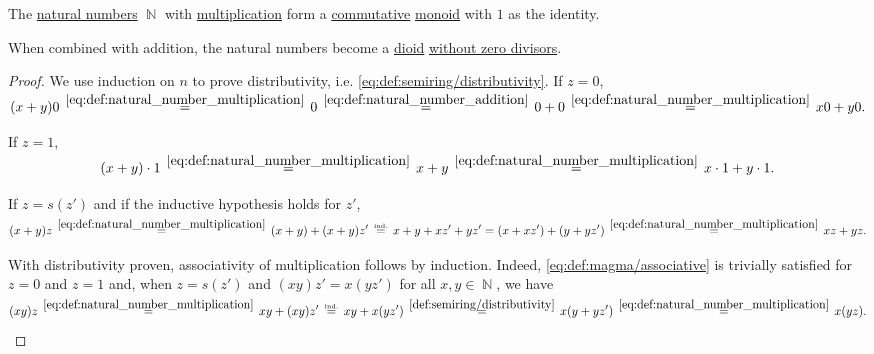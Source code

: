 \begin{proposition}\label{thm:natural_numbers_form_dioid}
  The \hyperref[def:set_of_natural_numbers]{natural numbers} \( \BbbN \) with \hyperref[def:natural_number_multiplication]{multiplication} form a \hyperref[def:magma/commutative]{commutative} \hyperref[def:unital_magma/associative]{monoid} with \( 1 \) as the identity.

  When combined with addition, the natural numbers become a \hyperref[def:semiring]{dioid} \hyperref[def:semiring/no_zero_divisor]{without zero divisors}.
\end{proposition}
\begin{proof}
   We use induction on \( n \) to prove distributivity, i.e. \eqref{eq:def:semiring/distributivity}. If \( z = 0 \),
  \begin{equation*}
    (x + y)0
    \reloset{\eqref{eq:def:natural_number_multiplication}} =
    0
    \reloset{\eqref{eq:def:natural_number_addition}} =
    0 + 0
    \reloset{\eqref{eq:def:natural_number_multiplication}} =
    x0 + y0.
  \end{equation*}

  If \( z = 1 \),
  \begin{equation*}
    (x + y) \cdot 1
    \reloset{\eqref{eq:def:natural_number_multiplication}} =
    x + y
    \reloset{\eqref{eq:def:natural_number_multiplication}} =
    x \cdot 1 + y \cdot 1.
  \end{equation*}

  If \( z = s(z') \) and if the inductive hypothesis holds for \( z' \),
  \begin{equation*}
    (x + y)z
    \reloset{\eqref{eq:def:natural_number_multiplication}} =
    (x + y) + (x + y) z'
    \reloset {\T{ind.}} =
    x + y + xz' + yz'
    =
    (x + xz') + (y + yz')
    \reloset{\eqref{eq:def:natural_number_multiplication}} =
    xz + yz.
  \end{equation*}

   With distributivity proven, associativity of multiplication follows by induction. Indeed, \eqref{eq:def:magma/associative} is trivially satisfied for \( z = 0 \) and \( z = 1 \) and, when \( z = s(z') \) and \( (xy)z' = x(yz') \) for all \( x, y \in \BbbN \), we have
  \begin{equation*}
    (xy)z
    \reloset{\eqref{eq:def:natural_number_multiplication}} =
    xy + (xy) z'
    \reloset {\T{ind.}} =
    xy + x(y z')
    \reloset{\ref{def:semiring/distributivity}} =
    x(y + y z')
    \reloset{\eqref{eq:def:natural_number_multiplication}} =
    x(yz).
  \end{equation*}


\end{proof}
